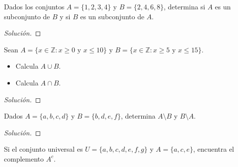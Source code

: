 \documentclass[a4,11pt]{aleph-notas}
\begin{document}
\encabezado

\begin{ejer}
    Dados los conjuntos $A = \{1, 2, 3, 4\}$ y $B = \{2, 4, 6, 8\}$, determina si $A$ es un subconjunto de $B$ y si $B$ es un subconjunto de $A$.
\end{ejer}

\begin{proof}[Solución]\hspace{0pt}
    
\end{proof}

\begin{ejer}
    Sean $A = \{x \in \mathbb{Z} : x \geq 0 \text{ y } x \leq 10\}$ y $B = \{x \in \mathbb{Z} : x \geq 5 \text{ y } x \leq 15\}$.
    \begin{itemize}
        \item Calcula $A \cup B$.
        \item Calcula $A \cap B$.
    \end{itemize}
\end{ejer}

\begin{proof}[Solución]\hspace{0pt}
    
\end{proof}

\begin{ejer}
    Dados $A = \{a, b, c, d\}$ y $B = \{b, d, e, f\}$, determina $A \setminus B$ y $B \setminus A$.
\end{ejer}

\begin{proof}[Solución]\hspace{0pt}
    
\end{proof}

\begin{ejer}
    Si el conjunto universal es $U = \{a, b, c, d, e, f, g\}$ y $A = \{a, c, e\}$, encuentra el complemento $A^c$.
\end{ejer}
\end{document}

